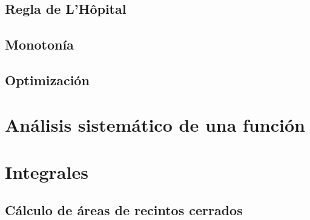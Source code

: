 \begin{defn}

\end{defn}

\begin{theorem}

\end{theorem}


\begin{theorem}
\end{theorem}

\subsection{Regla de L'Hôpital}

\subsection{Monotonía}

\begin{theorem}
\end{theorem}
\begin{theorem}
\end{theorem}

\subsection{Optimización}

\section{Análisis sistemático de una función}

\section{Integrales}

\subsection{Cálculo de áreas de recintos cerrados}